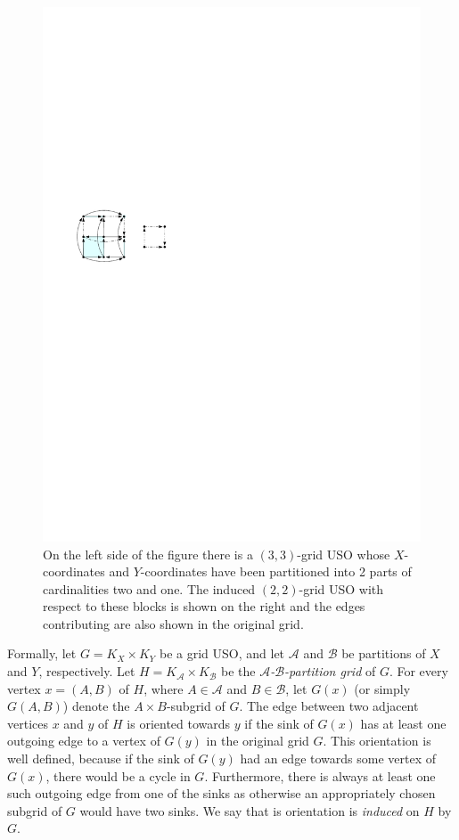 \documentclass[runningheads,a4paper]{llncs}
\newcommand{\A}{\ensuremath{\mathcal A}}
\newcommand{\B}{\ensuremath{\mathcal B}}
\begin{document}
  \begin{figure}[htbp] 
  	\centering
  	\includegraphics[scale=1.5]{induced_orientation_ex.pdf}
  	\caption{\small On the left side of the figure there is a $(3,3)$-grid USO whose $X$-coordinates and $Y$-coordinates have been partitioned into 2 parts of cardinalities two and one. The induced $(2,2)$-grid USO with respect to these blocks is shown on the right and the edges contributing are also shown in the original grid.} 
  	\label{fig:example_induced_orientation}
  \end{figure}

Formally, let $G = K_X \times K_Y$ be a grid USO,
and let $\A$ and $\B$ be partitions of $X$ and $Y$, respectively.
Let $H = K_\A \times K_\B$ be the \emph{$\A$-$\B$-partition grid} of $G$.
For every vertex $x = (A,B)$ of $H$, where $A\in \A$ and $B \in \B$, let $G(x)$ (or simply $G(A,B)$)
denote the $A \times B$-subgrid of $G$. 
The edge between two adjacent vertices $x$ and $y$ of $H$ is oriented towards $y$ if the sink of $G(x)$ has at least one outgoing edge to a vertex of $G(y)$ in the original grid $G$. 
This orientation is well defined, because if the sink of $G(y)$ had an edge towards some vertex of $G(x)$, there would be a cycle in $G$. 
Furthermore, there is always at least one such outgoing edge from one of the sinks as otherwise an appropriately chosen subgrid of $G$ would have two sinks. 
We say that is orientation is \emph{induced} on $H$ by $G$.
\end{document}
